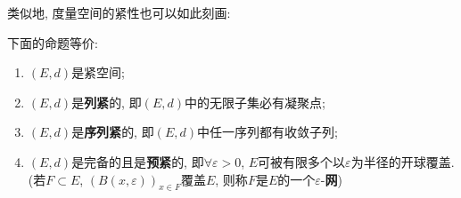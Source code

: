 	类似地, 度量空间的紧性也可以如此刻画:

	\begin{Theorem}[紧等价]\label{thm:紧等价}
		下面的命题等价:
		\begin{enumerate}[(1)]
			\item $ (E,d) $是紧空间;
			\item $ (E,d) $是\textbf{列紧}的, 即$ (E,d) $中的无限子集必有凝聚点;
			\item $ (E,d) $是\textbf{序列紧}的, 即$ (E,d) $中任一序列都有收敛子列;
			\item $ (E,d) $是完备的且是\textbf{预紧}的, 即$ \forall\varepsilon>0 $, $ E $可被有限多个以$ \varepsilon $为半径的开球覆盖. (若$ F\subset E $, $ (B(x,\varepsilon))_{x\in F} $覆盖$ E $, 则称$ F $是$ E $的一个$ \varepsilon $-\textbf{网})
		\end{enumerate}
	\end{Theorem}

